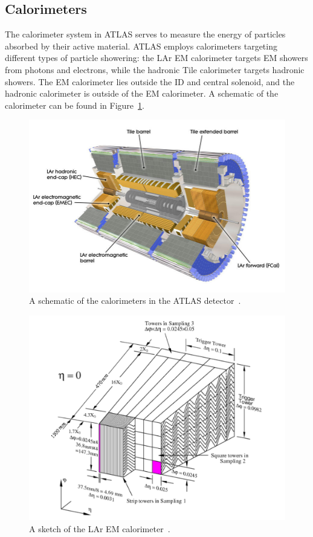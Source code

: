 \subsection{Calorimeters}\label{ssec:calorimeters}
The calorimeter system in ATLAS serves to measure the energy of particles absorbed by their active material. ATLAS employs calorimeters targeting different types of particle showering: the \gls{LAr} \gls{EM} calorimeter targets \gls{EM} showers from photons and electrons, while the hadronic Tile calorimeter targets hadronic showers. The \gls{EM} calorimeter lies outside the \gls{ID} and central solenoid, and the hadronic calorimeter is outside of the \gls{EM} calorimeter.  A schematic of the calorimeter can be found in Figure~\ref{fig:calorimeter}.


\begin{figure}[!ht]
    \centering
    \includegraphics[width=.8\textwidth]{chapters/chapter2_experiment/images/calorimeter.jpeg}
    \caption[A schematic of the calorimeters in the ATLAS detector]{A schematic of the calorimeters in the ATLAS detector~\cite{atlas-experiment}.}
    \label{fig:calorimeter}
\end{figure}

\begin{figure}[!ht]
    \centering
    \includegraphics[width=.9\textwidth]{chapters/chapter2_experiment/images/lar.png}
    \caption[A sketch of the \gls{LAr} \gls{EM} calorimeter]{A sketch of the \gls{LAr} \gls{EM} calorimeter~\cite{lar-tdr}.}
    \label{fig:lar}
\end{figure}

